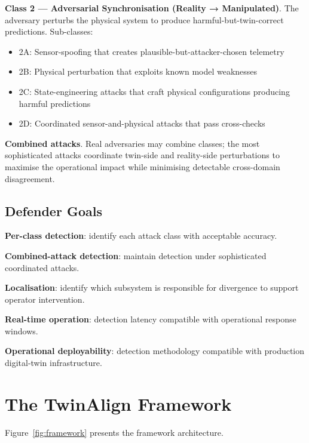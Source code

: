 \documentclass[sigconf,nonacm]{acmart}
\begin{document}
\textbf{Class 2 --- Adversarial Synchronisation (Reality →
Manipulated)}. The adversary perturbs the physical system to
produce harmful-but-twin-correct predictions. Sub-classes:

\begin{itemize}
  \item 2A: Sensor-spoofing that creates plausible-but-attacker-chosen
        telemetry
  \item 2B: Physical perturbation that exploits known model
        weaknesses
  \item 2C: State-engineering attacks that craft physical
        configurations producing harmful predictions
  \item 2D: Coordinated sensor-and-physical attacks that pass
        cross-checks
\end{itemize}

\textbf{Combined attacks}. Real adversaries may combine classes;
the most sophisticated attacks coordinate twin-side and
reality-side perturbations to maximise the operational impact while
minimising detectable cross-domain disagreement.

\subsection{Defender Goals}

\textbf{Per-class detection}: identify each attack class with
acceptable accuracy.

\textbf{Combined-attack detection}: maintain detection under
sophisticated coordinated attacks.

\textbf{Localisation}: identify which subsystem is responsible
for divergence to support operator intervention.

\textbf{Real-time operation}: detection latency compatible with
operational response windows.

\textbf{Operational deployability}: detection methodology
compatible with production digital-twin infrastructure.

\section{The TwinAlign Framework}

Figure~\ref{fig:framework} presents the framework architecture.
\end{document}
